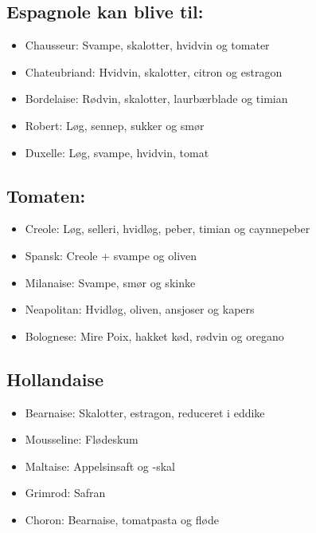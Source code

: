 \documentclass[
]{book}
\providecommand{\tightlist}{%
  \setlength{\itemsep}{0pt}\setlength{\parskip}{0pt}}
\begin{document}
\hypertarget{espagnole-kan-blive-til}{%
\subsection{Espagnole kan blive til:}\label{espagnole-kan-blive-til}}

\begin{itemize}
\tightlist
\item
  Chausseur: Svampe, skalotter, hvidvin og tomater
\item
  Chateubriand: Hvidvin, skalotter, citron og estragon
\item
  Bordelaise: Rødvin, skalotter, laurbærblade og timian
\item
  Robert: Løg, sennep, sukker og smør
\item
  Duxelle: Løg, svampe, hvidvin, tomat
\end{itemize}

\hypertarget{tomaten}{%
\subsection{Tomaten:}\label{tomaten}}

\begin{itemize}
\tightlist
\item
  Creole: Løg, selleri, hvidløg, peber, timian og caynnepeber
\item
  Spansk: Creole + svampe og oliven
\item
  Milanaise: Svampe, smør og skinke
\item
  Neapolitan: Hvidløg, oliven, ansjoser og kapers
\item
  Bolognese: Mire Poix, hakket kød, rødvin og oregano
\end{itemize}

\hypertarget{hollandaise}{%
\subsection{Hollandaise}\label{hollandaise}}

\begin{itemize}
\tightlist
\item
  Bearnaise: Skalotter, estragon, reduceret i eddike
\item
  Mousseline: Flødeskum
\item
  Maltaise: Appelsinsaft og -skal
\item
  Grimrod: Safran
\item
  Choron: Bearnaise, tomatpasta og fløde
\end{itemize}
\end{document}
